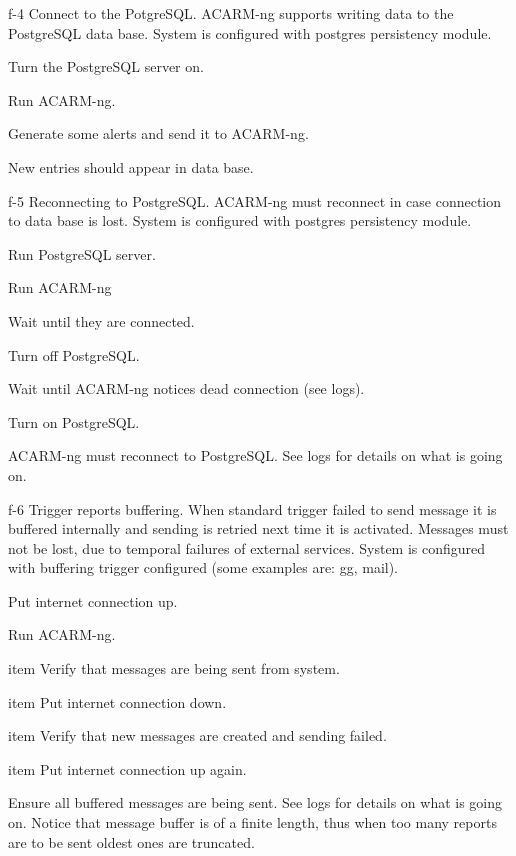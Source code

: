\testCase
{f-4}
{Connect to the PotgreSQL.}
{ACARM-ng supports writing data to the PostgreSQL data base.}
{System is configured with postgres persistency module.}
{
\begin{enumerate*}
\item Turn the PostgreSQL server on.
\item Run ACARM-ng.
\item Generate some alerts and send it to ACARM-ng.
\end{enumerate*}
}
{New entries should appear in data base.}
{}


\testCase
{f-5}
{Reconnecting to PostgreSQL.}
{ACARM-ng must reconnect in case connection to data base is lost.}
{System is configured with postgres persistency module.}
{
\begin{enumerate*}
\item Run PostgreSQL server.
\item Run ACARM-ng
\item Wait until they are connected.
\item Turn off PostgreSQL.
\item Wait until ACARM-ng notices dead connection (see logs).
\item Turn on PostgreSQL.
\end{enumerate*}
}
{ACARM-ng must reconnect to PostgreSQL.}
{See logs for details on what is going on.}


\testCase
{f-6}
{Trigger reports buffering.}
{When standard trigger failed to send message it is buffered internally and sending is retried next time it is activated. Messages must not be lost, due to temporal failures of external services.}
{System is configured with buffering trigger configured (some examples are: gg, mail).}
{
\begin{enumerate*}
\item Put internet connection up.
\item Run ACARM-ng.
\item item Verify that messages are being sent from system.
\item item Put internet connection down.
\item item Verify that new messages are created and sending failed.
\item item Put internet connection up again.
\end{enumerate*}
}
{Ensure all buffered messages are being sent.}
{See logs for details on what is going on. Notice that message buffer is of a finite length, thus when too many reports are to be sent oldest ones are truncated.}


